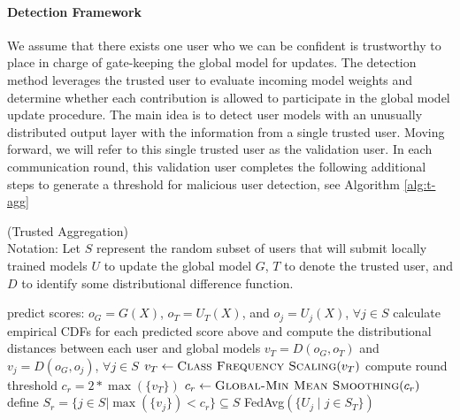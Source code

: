 \documentclass{article} %
\begin{document}
\paragraph{Detection Framework}

We assume that there exists one user who we can be confident is trustworthy to place in charge of gate-keeping the global model for updates. The detection method leverages the trusted user to evaluate incoming model weights and determine whether each contribution is allowed to participate in the global model update procedure. The main idea is to detect user models with an unusually distributed output layer with the information from a single trusted user. Moving forward, we will refer to this single trusted user as the validation user. In each communication round, this validation user completes the following additional steps to generate a threshold for malicious user detection, see Algorithm \ref{alg:t-agg}

\begin{algorithm}[H]
\caption{ (Trusted Aggregation) \\ 
Notation: Let $S$ represent the random subset of users that will submit locally trained models $U$ to update the global model $G$, $T$ to denote the trusted user, and $D$ to identify some distributional difference function.
}
\label{alg:t-agg}
\begin{algorithmic}[1]

            \State predict scores: $o_G = G(X)$, $o_{T} = U_T(X)$, and $o_j = U_j(X)$, $\forall j \in S$
            \State calculate empirical CDFs for each predicted score above 
            \State \quad and compute the distributional distances between each user and global models 
            \State \quad $v_T = D(o_G, o_T)$ and $v_{j} = D(o_G, o_{j})$, $\forall j \in S$
            \State $v_T \gets \Call{Class Frequency Scaling}{v_T}$  
        \EndFor
        \State compute round threshold $c_r = 2 * \max ( \{v_T\} )$
        \State  $c_r \gets \Call{Global-Min Mean Smoothing}{c_r}$  
        \State define $S_r = \{j \in S | \max (\{v_{j}\}) < c_r \} \subseteq S$
        \State \Return FedAvg$(\{U_j \mid j \in S_T \})$ 
    \EndProcedure
\end{algorithmic}
\end{algorithm}


%
\end{document}
